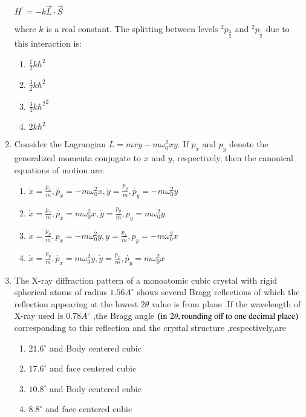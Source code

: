 \documentclass[journal]{IEEEtran}
\begin{document}
\begin{enumerate}
\begin{center}
 $H^{\prime} = -k\overrightarrow{L}\cdot\overrightarrow{S} $  
\end{center}
where $k$  is a real constant. The splitting between levels $^2p_{\frac{3}{2}}$ and $^2p_{\frac{1}{2}}$ due to this interaction is:
\begin{enumerate}
	\item $\frac{1}{2}k{\hbar}^2$ 
	\item $\frac{3}{2}k{\hbar}^2$ 
	\item $\frac{3}{4}k{\hbar^2}^2$ 
	\item $2k{\hbar}^2$
\end{enumerate}
\item Consider the Lagrangian $L=m\dot{x}\dot{y}-m\omega_0^2xy$. If $p_x$ and $p_y$ denote the generalized momenta conjugate to $x$ and $y$, respectively, then the canonical equations of motion are:
\begin{enumerate}
\item $\dot{x}=\frac{p_x}{m},\dot{p_x}=-m\omega_0^2x,\dot{y}=\frac{p_y}{m},\dot{p_y}=-m\omega_0^2y$
\item $\dot{x} = \frac{p_x}{m},\dot{p_x}=m\omega_0^2x,\dot{y}=\frac{p_y}{m},\dot{p_y}=m\omega_0^2y$
\item $\dot{x}=\frac{p_y}{m},\dot{p_x}=-m\omega_0^2 y,\dot{y}=\frac{p_x}{m},\dot{p_y}=-m\omega_0^2x$
\item $\dot{x}=\frac{p_y}{m},\dot{p_x}=m\omega_0^2y,\dot{y}=\frac{p_x}{m},\dot{p_y}=m\omega_0^2 x$
\end{enumerate}
\item The X-ray diffraction pattern of a monoatomic cubic crystal with rigid spherical atoms of radius $1.56A^{\circ}$ shows several Bragg reflections of which the reflection appearing at the lowest $2\theta$ value is from  plane .If the wavelength of X-ray used is $0.78A^{\circ}$ ,the Bragg angle $\left(\text{in} \, \, 2\theta , \text{rounding off to one decimal place}\right)$ corresponding to this reflection and the crystal structure ,respectively,are
\begin{enumerate}
\item $21.6^{\circ}$ and Body centered cubic
\item $17.6^{\circ}$ and face centered cubic
\item $10.8^{\circ}$ and Body centered cubic
\item $8.8^{\circ}$ and face centered cubic
\end{enumerate}
\end{enumerate}
\end{document}
